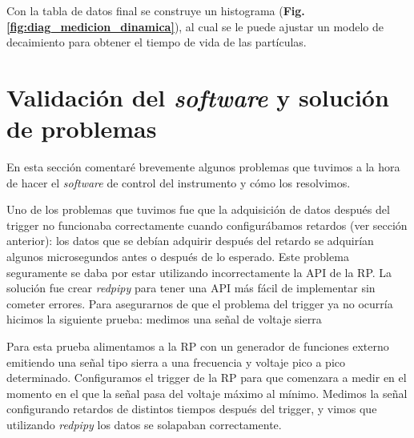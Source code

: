 Con la tabla de datos final se construye un histograma (\textbf{Fig. \ref{fig:diag_medicion_dinamica}}), al cual se le puede ajustar un modelo de decaimiento para obtener el tiempo de vida de las partículas.


\section{Validación del \textit{software} y solución de problemas}

En esta sección comentaré brevemente algunos problemas que tuvimos a la hora de hacer el \textit{software} de control del instrumento y cómo los resolvimos.

Uno de los problemas que tuvimos fue que la adquisición de datos después del trigger no funcionaba correctamente cuando configurábamos retardos (ver sección anterior): los datos que se debían adquirir después del retardo se adquirían algunos microsegundos antes o después de lo esperado.
Este problema seguramente se daba por estar utilizando incorrectamente la API de la RP.
La solución fue crear \textit{redpipy} para tener una API más fácil de implementar sin cometer errores.
Para asegurarnos de que el problema del trigger ya no ocurría hicimos la siguiente prueba: medimos una señal de voltaje sierra 

Para esta prueba alimentamos a la RP con un generador de funciones externo emitiendo una señal tipo sierra a una frecuencia y voltaje pico a pico determinado.
Configuramos el trigger de la RP para que comenzara a medir en el momento en el que la señal pasa del voltaje máximo al mínimo.
Medimos la señal configurando retardos de distintos tiempos después del trigger, y vimos que utilizando \textit{redpipy} los datos se solapaban correctamente.


